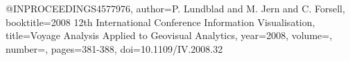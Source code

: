 @INPROCEEDINGS{4577976,
  author={P. {Lundblad} and M. {Jern} and C. {Forsell}},
  booktitle={2008 12th International Conference Information Visualisation}, 
  title={Voyage Analysis Applied to Geovisual Analytics}, 
  year={2008},
  volume={},
  number={},
  pages={381-388},
  doi={10.1109/IV.2008.32}}